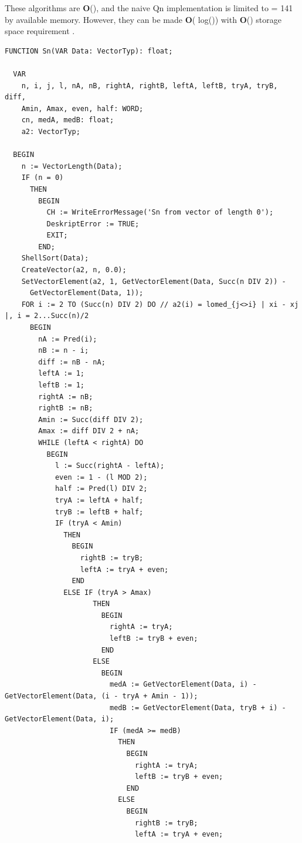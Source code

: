 \begin{refsection}
These algorithms are \textbf{O}(), and the naive Qn implementation is limited to  = 141 by available memory. However, they can be made \textbf{O}( log()) with \textbf{O}() storage space requirement \parencite{Cro-92}.

\begin{lstlisting}[caption= final Sn: \textbf{O}($n \log(n)$)]
  FUNCTION Sn(VAR Data: VectorTyp): float;

  VAR
    n, i, j, l, nA, nB, rightA, rightB, leftA, leftB, tryA, tryB, diff,
    Amin, Amax, even, half: WORD;
    cn, medA, medB: float;
    a2: VectorTyp;

  BEGIN
    n := VectorLength(Data);
    IF (n = 0)
      THEN
        BEGIN
          CH := WriteErrorMessage('Sn from vector of length 0');
          DeskriptError := TRUE;
          EXIT;
        END;
    ShellSort(Data);
    CreateVector(a2, n, 0.0);
    SetVectorElement(a2, 1, GetVectorElement(Data, Succ(n DIV 2)) -
      GetVectorElement(Data, 1));
    FOR i := 2 TO (Succ(n) DIV 2) DO // a2(i) = lomed_{j<>i} | xi - xj |, i = 2...Succ(n)/2
      BEGIN
        nA := Pred(i);
        nB := n - i;
        diff := nB - nA;
        leftA := 1;
        leftB := 1;
        rightA := nB;
        rightB := nB;
        Amin := Succ(diff DIV 2);
        Amax := diff DIV 2 + nA;
        WHILE (leftA < rightA) DO
          BEGIN
            l := Succ(rightA - leftA);
            even := 1 - (l MOD 2);
            half := Pred(l) DIV 2;
            tryA := leftA + half;
            tryB := leftB + half;
            IF (tryA < Amin)
              THEN
                BEGIN
                  rightB := tryB;
                  leftA := tryA + even;
                END
              ELSE IF (tryA > Amax)
                     THEN
                       BEGIN
                         rightA := tryA;
                         leftB := tryB + even;
                       END
                     ELSE
                       BEGIN
                         medA := GetVectorElement(Data, i) - GetVectorElement(Data, (i - tryA + Amin - 1));
                         medB := GetVectorElement(Data, tryB + i) - GetVectorElement(Data, i);
                         IF (medA >= medB)
                           THEN
                             BEGIN
                               rightA := tryA;
                               leftB := tryB + even;
                             END
                           ELSE
                             BEGIN
                               rightB := tryB;
                               leftA := tryA + even;

\end{lstlisting}
\end{refsection}
